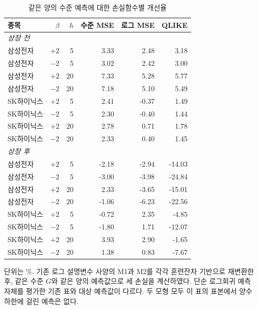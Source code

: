 \begin{table}[htbp]\centering\small
\caption{같은 양의 수준 예측에 대한 손실함수별 개선율}\label{tab:common_loss}
\begin{tabular}{lrrrrr}\toprule
종목 & $\beta$ & $h$ & 수준 MSE & 로그 MSE & QLIKE\\\midrule
\multicolumn{6}{l}{\textit{상장 전}}\\
삼성전자 & $+2$ & 5 & 3.33 & 2.48 & 3.18\\
삼성전자 & $-2$ & 5 & 3.02 & 2.42 & 3.00\\
삼성전자 & $+2$ & 20 & 7.33 & 5.28 & 5.77\\
삼성전자 & $-2$ & 20 & 7.18 & 5.10 & 5.49\\
SK하이닉스 & $+2$ & 5 & 2.41 & -0.37 & 1.49\\
SK하이닉스 & $-2$ & 5 & 2.30 & -0.40 & 1.44\\
SK하이닉스 & $+2$ & 20 & 2.78 & 0.71 & 1.78\\
SK하이닉스 & $-2$ & 20 & 2.33 & 0.40 & 1.45\\
\midrule
\multicolumn{6}{l}{\textit{상장 후}}\\
삼성전자 & $+2$ & 5 & -2.18 & -2.94 & -14.03\\
삼성전자 & $-2$ & 5 & -3.00 & -3.98 & -24.84\\
삼성전자 & $+2$ & 20 & 2.33 & -3.65 & -15.01\\
삼성전자 & $-2$ & 20 & -1.06 & -6.23 & -22.56\\
SK하이닉스 & $+2$ & 5 & -0.72 & 2.35 & -4.85\\
SK하이닉스 & $-2$ & 5 & -1.80 & 1.71 & -12.07\\
SK하이닉스 & $+2$ & 20 & 3.93 & 2.90 & -1.65\\
SK하이닉스 & $-2$ & 20 & 1.38 & 0.83 & -7.67\\
\bottomrule\end{tabular}
\smallskip
\begin{minipage}{0.97\textwidth}\footnotesize 단위는 \%. 기존 로그 설명변수 사양의 M1과 M2를 각각 훈련잔차 기반으로 재변환한 후, 같은 수준 $G$와 같은 양의 예측값으로 세 손실을 계산하였다. 단순 로그회귀 예측 자체를 평가한 기존 표와 대상 예측값이 다르다. 두 모형 모두 이 표의 표본에서 양수 하한에 걸린 예측은 없다.\end{minipage}
\end{table}
